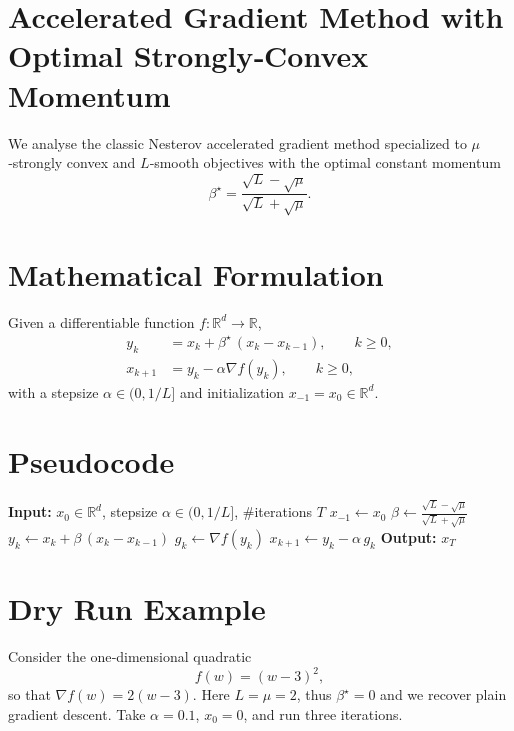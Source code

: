 \documentclass{article}
\newcommand{\R}{\mathbb{R}}
\begin{document}
\section*{Accelerated Gradient Method with Optimal Strongly‑Convex Momentum}
We analyse the classic Nesterov accelerated gradient method specialized to $\mu$‑strongly convex and $L$‑smooth objectives with the optimal constant momentum
\[
\beta^{\star}= \frac{\sqrt{L}-\sqrt{\mu}}{\sqrt{L}+\sqrt{\mu}}.
\]

\section*{Mathematical Formulation}
Given a differentiable function $f:\R^{d}\rightarrow\R$,
\begin{align}
y_{k}      &= x_{k}+ \beta^{\star}\,(x_{k}-x_{k-1}),\qquad k\ge 0,\label{eq:y}\\
x_{k+1}    &= y_{k}-\alpha \nabla f(y_{k}),\qquad k\ge 0,\label{eq:x}
\end{align}
with a stepsize $\alpha\in(0,1/L]$ and initialization $x_{-1}=x_{0}\in\R^{d}$.  

\section*{Pseudocode}
\begin{algorithm}[H]
\caption{Accelerated Gradient with Optimal Momentum}
\begin{algorithmic}[1]
\State \textbf{Input:} $x_{0}\in\R^{d}$, stepsize $\alpha\in(0,1/L]$, \#iterations $T$
\State $x_{-1}\gets x_{0}$
\State $\displaystyle \beta\gets\frac{\sqrt{L}-\sqrt{\mu}}{\sqrt{L}+\sqrt{\mu}}$
    \State $y_{k}\gets x_{k}+ \beta\,(x_{k}-x_{k-1})$ \hfill{}
    \State $g_{k}\gets \nabla f(y_{k})$ \hfill{}
    \State $x_{k+1}\gets y_{k}-\alpha\, g_{k}$ \hfill{}
\EndFor
\State \textbf{Output:} $x_{T}$
\end{algorithmic}
\end{algorithm}

\section*{Dry Run Example}
Consider the one‑dimensional quadratic
\[
f(w)=(w-3)^{2},
\]
so that $\nabla f(w)=2(w-3)$.  Here $L=\mu=2$, thus $\beta^{\star}=0$ and we recover plain gradient descent.  
Take $\alpha=0.1$, $x_{0}=0$, and run three iterations.
\end{document}
